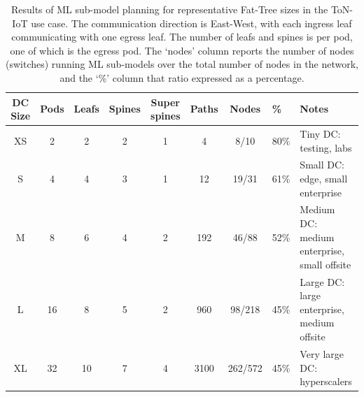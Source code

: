 \begin{table}[h]
\centering
\caption{Results of \name ML sub-model planning for representative Fat-Tree sizes in the ToN-IoT use case. The communication direction is East-West, with each ingress leaf communicating with one egress leaf. The number of leafs and spines is per pod, one of which is the egress pod. The `nodes' column reports the number of nodes (\ie switches) running ML sub-models over the total number of nodes in the network, and the `\%' column that ratio expressed as a percentage.}
\label{tab:planner_perf}
\begin{tabular}{cccccccll}
\toprule
DC Size & Pods & Leafs & Spines & Super spines & Paths & Nodes & \% & Notes \\
\midrule
XS & 2  & 2  & 2  & 1 & 4    & 8/10  & 80\% & Tiny DC: testing, labs \\
S  & 4  & 4  & 3  & 1 & 12   & 19/31 & 61\% & Small DC: edge, small enterprise \\
M  & 8  & 6  & 4  & 2 & 192  & 46/88 & 52\% & Medium DC: medium enterprise, small offsite \\
L  & 16 & 8  & 5  & 2 & 960 & 98/218 & 45\% & Large DC: large enterprise, medium offsite \\
XL & 32 & 10 & 7  & 4 & 3100 & 262/572 & 45\% & Very large DC: hyperscalers \\
\bottomrule
\end{tabular}
\vspace*{-13pt}
\end{table}
